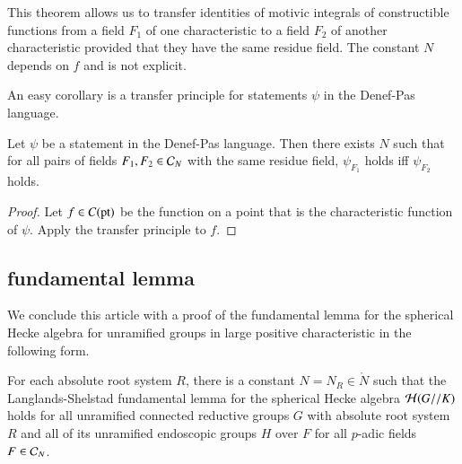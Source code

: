 This theorem allows us to transfer identities of motivic integrals of
constructible functions from a field $F_1$ of one characteristic to a
field $F_2$ of another characteristic provided that they have the same
residue field.  The constant $N$ depends on $f$ and is not explicit.

An easy corollary is a transfer principle for statements $\psi$ in the
Denef-Pas language.

\begin{corollary} Let $\psi$ be a statement in the Denef-Pas language.
  Then there exists $N$ such that for all pairs of fields $F_1,F_2\in
  \mathcal C_N$ with the same residue field, $\psi_{F_1}$ holds iff
  $\psi_{F_2}$ holds.
\end{corollary}

\begin{proof} Let $f\in C({\operatorname{pt}})$ be the function on a point that is
  the characteristic function of $\psi$.  Apply the transfer principle
  to $f$.
\end{proof}

\subsection{fundamental lemma}

We conclude this article with a proof of the fundamental lemma for the
spherical Hecke algebra for unramified groups in large positive
characteristic in the following form.

\begin{theorem} \label{thm:fl} For each absolute root system $R$,
  there is a constant $N=N_R\in\ring{N}$ such that the
  Langlands-Shelstad fundamental lemma for the spherical Hecke algebra
  $\mathcal H(G//K)$ holds for all unramified
  connected reductive groups $G$ with absolute root system $R$ and all
  of its unramified endoscopic groups $H$ over $F$ for all
  $p$-adic fields $F\in \mathcal C_N$.
\end{theorem}


